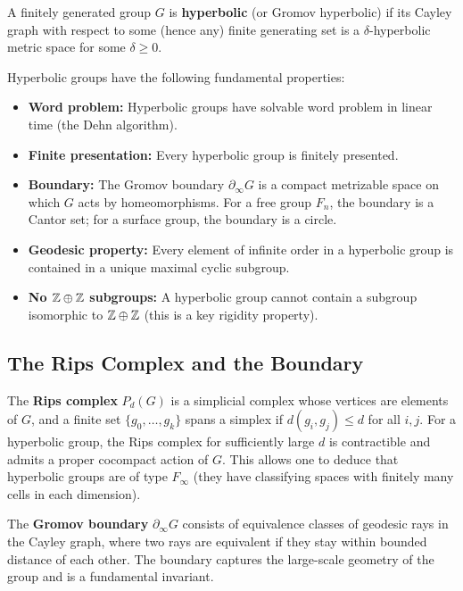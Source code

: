 \begin{definition}
A finitely generated group \(G\) is \textbf{hyperbolic} (or Gromov hyperbolic) if its Cayley graph with respect to some (hence any) finite generating set is a \(\delta\)-hyperbolic metric space for some \(\delta \geq 0\).
\end{definition}

\begin{theorem}
Hyperbolic groups have the following fundamental properties:
\begin{itemize}
    \item \textbf{Word problem:} Hyperbolic groups have solvable word problem in linear time (the Dehn algorithm).
    \item \textbf{Finite presentation:} Every hyperbolic group is finitely presented.
    \item \textbf{Boundary:} The Gromov boundary \(\partial_\infty G\) is a compact metrizable space on which \(G\) acts by homeomorphisms. For a free group \(F_n\), the boundary is a Cantor set; for a surface group, the boundary is a circle.
    \item \textbf{Geodesic property:} Every element of infinite order in a hyperbolic group is contained in a unique maximal cyclic subgroup.
    \item \textbf{No \(\mathbb{Z} \oplus \mathbb{Z}\) subgroups:} A hyperbolic group cannot contain a subgroup isomorphic to \(\mathbb{Z} \oplus \mathbb{Z}\) (this is a key rigidity property).
\end{itemize}
\end{theorem}

\subsection{The Rips Complex and the Boundary}

The \textbf{Rips complex} \(P_d(G)\) is a simplicial complex whose vertices are elements of \(G\), and a finite set \(\{g_0, \dots, g_k\}\) spans a simplex if \(d(g_i, g_j) \leq d\) for all \(i, j\). For a hyperbolic group, the Rips complex for sufficiently large \(d\) is contractible and admits a proper cocompact action of \(G\). This allows one to deduce that hyperbolic groups are of type \(F_\infty\) (they have classifying spaces with finitely many cells in each dimension).

The \textbf{Gromov boundary} \(\partial_\infty G\) consists of equivalence classes of geodesic rays in the Cayley graph, where two rays are equivalent if they stay within bounded distance of each other. The boundary captures the large-scale geometry of the group and is a fundamental invariant.

